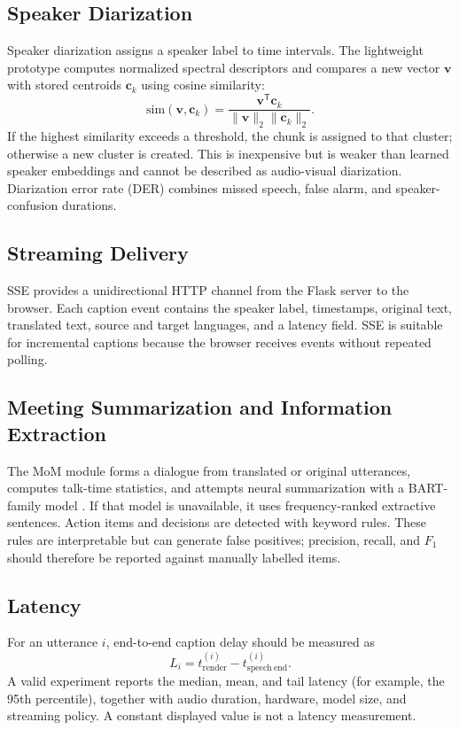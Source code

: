 \documentclass[conference]{IEEEtran}
\begin{document}
\subsection{Speaker Diarization}
Speaker diarization assigns a speaker label to time intervals. The lightweight prototype computes normalized spectral descriptors and compares a new vector $\mathbf{v}$ with stored centroids $\mathbf{c}_k$ using cosine similarity:
\begin{equation}
\mathrm{sim}(\mathbf{v},\mathbf{c}_k)=
\frac{\mathbf{v}^{\mathsf T}\mathbf{c}_k}{\lVert\mathbf{v}\rVert_2\lVert\mathbf{c}_k\rVert_2}.
\end{equation}
If the highest similarity exceeds a threshold, the chunk is assigned to that cluster; otherwise a new cluster is created. This is inexpensive but is weaker than learned speaker embeddings and cannot be described as audio-visual diarization. Diarization error rate (DER) combines missed speech, false alarm, and speaker-confusion durations.

\subsection{Streaming Delivery}
SSE provides a unidirectional HTTP channel from the Flask server to the browser. Each caption event contains the speaker label, timestamps, original text, translated text, source and target languages, and a latency field. SSE is suitable for incremental captions because the browser receives events without repeated polling.

\subsection{Meeting Summarization and Information Extraction}
The MoM module forms a dialogue from translated or original utterances, computes talk-time statistics, and attempts neural summarization with a BART-family model \cite{lewis2020bart}. If that model is unavailable, it uses frequency-ranked extractive sentences. Action items and decisions are detected with keyword rules. These rules are interpretable but can generate false positives; precision, recall, and $F_1$ should therefore be reported against manually labelled items.

\subsection{Latency}
For an utterance $i$, end-to-end caption delay should be measured as
\begin{equation}
L_i=t^{(i)}_{\mathrm{render}}-t^{(i)}_{\mathrm{speech\ end}}.
\end{equation}
A valid experiment reports the median, mean, and tail latency (for example, the 95th percentile), together with audio duration, hardware, model size, and streaming policy. A constant displayed value is not a latency measurement.
\end{document}
